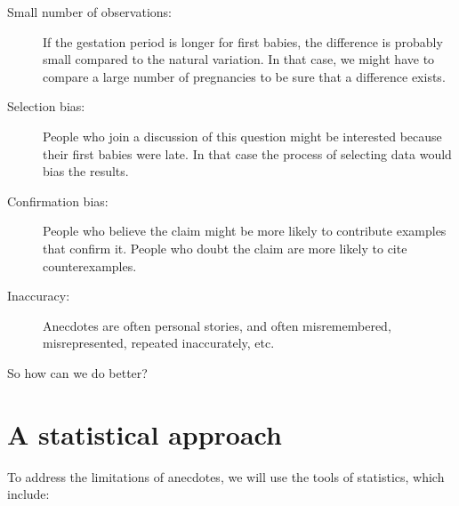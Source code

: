 \documentclass[12pt]{book}
\begin{document}
\begin{description}

\item[Small number of observations:] If the gestation period is longer
  for first babies, the difference is probably small compared to the
  natural variation.  In that case, we might have to compare a large
  number of pregnancies to be sure that a difference exists.

\item[Selection bias:] People who join a discussion of this question
  might be interested because their first babies were late.  In that
  case the process of selecting data would bias the results.

\item[Confirmation bias:] People who believe the claim might be more
  likely to contribute examples that confirm it.  People who doubt the
  claim are more likely to cite counterexamples.

\item[Inaccuracy:] Anecdotes are often personal stories, and often
  misremembered, misrepresented, repeated
  inaccurately, etc.

\end{description}

So how can we do better?

\section{A statistical approach}

To address the limitations of anecdotes, we will use the tools
of statistics, which include:
\end{document}
